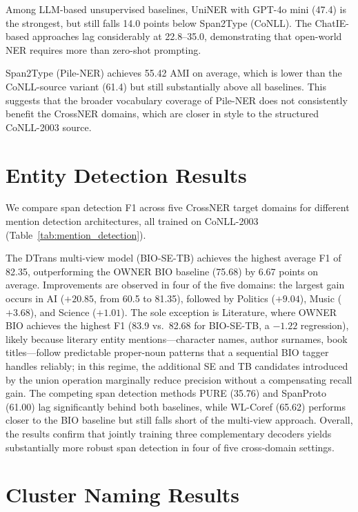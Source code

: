 \documentclass[14pt]{extreport}
\begin{document}
Among LLM-based unsupervised baselines, UniNER with GPT-4o mini (47.4) is the strongest, but still falls 14.0 points below Span2Type (CoNLL). The ChatIE-based approaches lag considerably at 22.8--35.0, demonstrating that open-world NER requires more than zero-shot prompting.

Span2Type (Pile-NER) achieves 55.42 AMI on average, which is lower than the CoNLL-source variant (61.4) but still substantially above all baselines. This suggests that the broader vocabulary coverage of Pile-NER does not consistently benefit the CrossNER domains, which are closer in style to the structured CoNLL-2003 source.


\section{Entity Detection Results}

We compare span detection F1 across five CrossNER target domains for different mention detection architectures, all trained on CoNLL-2003 (Table~\ref{tab:mention_detection}).

\FloatBarrier



\FloatBarrier

The DTrans multi-view model (BIO-SE-TB) achieves the highest average F1 of 82.35, outperforming the OWNER BIO baseline (75.68) by 6.67 points on average. Improvements are observed in four of the five domains: the largest gain occurs in AI ($+20.85$, from 60.5 to 81.35), followed by Politics ($+9.04$), Music ($+3.68$), and Science ($+1.01$). The sole exception is Literature, where OWNER BIO achieves the highest F1 (83.9 vs.\ 82.68 for BIO-SE-TB, a $-1.22$ regression), likely because literary entity mentions---character names, author surnames, book titles---follow predictable proper-noun patterns that a sequential BIO tagger handles reliably; in this regime, the additional SE and TB candidates introduced by the union operation marginally reduce precision without a compensating recall gain. The competing span detection methods PURE (35.76) and SpanProto (61.00) lag significantly behind both baselines, while WL-Coref (65.62) performs closer to the BIO baseline but still falls short of the multi-view approach. Overall, the results confirm that jointly training three complementary decoders yields substantially more robust span detection in four of five cross-domain settings.


\section{Cluster Naming Results}
\end{document}
